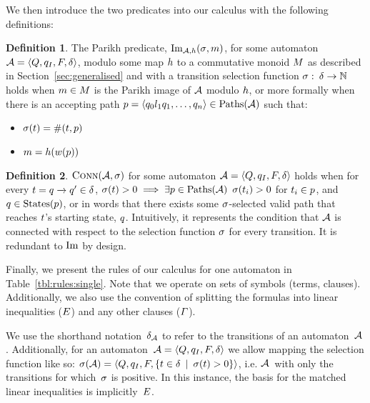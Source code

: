 \documentclass[acmsmall,review,anonymous]{acmart}\settopmatter{printfolios=true,printccs=false,printacmref=true}
\theoremstyle{definition}
\newtheorem{definition}{Definition}[section]
\begin{document}
We then introduce the two predicates into our calculus with the following
definitions:

\begin{definition}
  The Parikh predicate, $\operatorname{Im}_{\mathcal{A}, h}(\operatorname{\sigma}, m)$, for some automaton
  $\mathcal{A} = \left\langle Q, q_I, F, \delta\right\rangle$, modulo some map $h$ to a commutative monoid
  $M$ as described in Section~\ref{sec:generalised} and with a transition
  selection function $\operatorname{\sigma}:\: \delta \to \mathbb{N}$ holds when
  $m \in M$ is the Parikh image of $\mathcal{A}$ modulo
  $h$, or more formally when there is an accepting path $p =
  \left\langle q_0 l_1 q_1 , \ldots , q_n\right\rangle \in \operatorname{Paths}(\mathcal{A})$ such that:
  \begin{itemize}
    \item $\operatorname{\sigma}(t) = \operatorname{\#}(t, p)$
    \item $m = h(w(p))$
  \end{itemize}
\end{definition}

\begin{definition}
  $\operatorname{\textsc{Conn}}(\mathcal{A}, \operatorname{\sigma})$ for some automaton $\mathcal{A} =
  \left\langle Q, q_I, F, \delta\right\rangle$ holds when for every $t =
  q \xrightarrow{} q' \in \delta$, $\operatorname{\sigma}(t) > 0
  \implies \exists p \in \operatorname{Paths}(\mathcal{A})$ $\operatorname{\sigma}(t_i) > 0$
  for $t_i \in p$, and $q \in \operatorname{States}(p)$, or in words that
  there exists some $\operatorname{\sigma}$-selected valid path that reaches $t$'s
  starting state, $q$. Intuitively, it represents the condition that
  $\mathcal{A}$ is connected with respect to the selection function $\operatorname{\sigma}$ for
  every transition. It is redundant to $\operatorname{Im}$ by design.
\end{definition}

Finally, we present the rules of our calculus for one automaton in Table~\ref{tbl:rules:single}. Note that we
operate on sets of symbols (terms, clauses). Additionally, we also use the
convention of splitting the formulas into linear inequalities ($E$)
and any other clauses ($\varGamma$).

We use the shorthand notation~$\delta_{\mathcal{A}}$ to refer to the
transitions of an automaton~$\mathcal{A}$. Additionally, for an
automaton~$\mathcal{A} = \left\langle Q, q_I, F, \delta\right\rangle$ we allow mapping the selection function
like so: $\operatorname{\sigma}(\mathcal{A}) = \left\langle Q, q_I, F,
\left\{t \in \delta \:\mid\: \operatorname{\sigma}(t) > 0\right\}\right\rangle$, i.e.
$\mathcal{A}$~with only the transitions for which~$\operatorname{\sigma}$ is positive. In this
instance, the basis for the matched linear inequalities is
implicitly~$E$.
\end{document}
